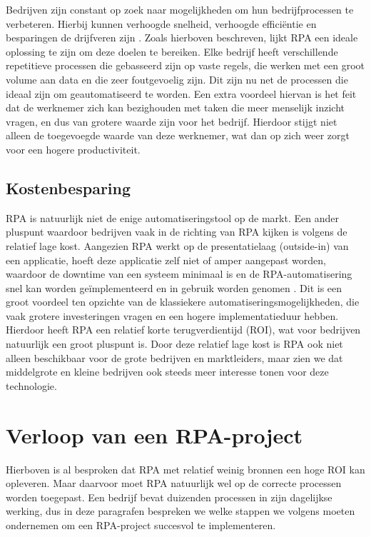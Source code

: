 Bedrijven zijn constant op zoek naar mogelijkheden om hun bedrijfprocessen te verbeteren. Hierbij kunnen verhoogde snelheid, verhoogde efficiëntie en besparingen de drijfveren zijn \autocite{Axmann2022}. Zoals hierboven beschreven, lijkt RPA een ideale oplossing te zijn om deze doelen te bereiken. Elke bedrijf heeft verschillende repetitieve processen die gebasseerd zijn op vaste regels, die werken met een groot volume aan data en die zeer foutgevoelig zijn. Dit zijn nu net de processen die ideaal zijn om geautomatiseerd te worden. 
Een extra voordeel hiervan is het feit dat de werknemer zich kan bezighouden met taken die meer menselijk inzicht vragen, en dus van grotere waarde zijn voor het bedrijf. Hierdoor stijgt niet alleen de toegevoegde waarde van deze werknemer, wat dan op zich weer zorgt voor een hogere productiviteit.

\subsection{Kostenbesparing}

RPA is natuurlijk niet de enige automatiseringstool op de markt. Een ander pluspunt waardoor bedrijven vaak in de richting van RPA kijken is volgens \textcite{Fernandez2021} de relatief lage kost. Aangezien RPA werkt op de presentatielaag (outside-in) van een applicatie, hoeft deze applicatie zelf niet of amper aangepast worden, waardoor de downtime van een systeem minimaal is en de RPA-automatisering snel kan worden geïmplementeerd en in gebruik worden genomen \autocite{Asquith2019}. Dit is een groot voordeel ten opzichte van de klassiekere automatiseringsmogelijkheden, die vaak grotere investeringen vragen en een hogere implementatieduur hebben. 
Hierdoor heeft RPA een relatief korte terugverdientijd (ROI), wat voor bedrijven natuurlijk een groot pluspunt is.
Door deze relatief lage kost is RPA ook niet alleen beschikbaar voor de grote bedrijven en marktleiders, maar zien we dat middelgrote en kleine bedrijven ook steeds meer interesse tonen voor deze technologie.

\section{Verloop van een RPA-project}

Hierboven is al besproken dat RPA met relatief weinig bronnen een hoge ROI kan opleveren.
Maar daarvoor moet RPA natuurlijk wel op de correcte processen worden toegepast.
Een bedrijf bevat duizenden processen in zijn dagelijkse werking, dus in deze paragrafen bespreken we welke stappen we volgens \textcite{El-Gharib2023} moeten ondernemen om een RPA-project succesvol te implementeren.

